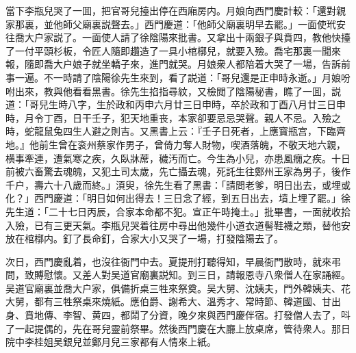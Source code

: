 當下李瓶兒哭了一囬，把官哥兒擡出停在西廂房内。月娘向西門慶計較：「還對親家那裏，並他師父廟裏説聲去。」西門慶道：「他師父廟裏明早去罷。」一面使玳安往喬大户家説了。一面使人請了徐陰陽來批書。又拿出十兩銀子與賁四，教他快擡了一付平頭杉板，令匠人隨即趲造了一具小棺槨兒，就要入殮。喬宅那裏一聞來報，隨即喬大户娘子就坐轎子來，進門就哭。月娘衆人都陪着大哭了一場，告訴前事一遍。不一時請了陰陽徐先生來到，看了説道：「哥兒還是正申時永逝。」月娘吩咐出來，教與他看看黑書。徐先生掐指尋紋，又檢閲了陰陽秘書，瞧了一囬，説道：「哥兒生時八字，生於政和丙申六月廿三日申時，卒於政和丁酉八月廿三日申時，月令丁酉，日干壬子，犯天地重丧，本家卻要忌忌哭聲。親人不忌。入殮之時，蛇龍鼠兔四生人避之則吉。又黑書上云：『壬子日死者，上應寳瓶宫，下臨齊地。』他前生曾在衮州蔡家作男子，曾倚力奪人財物，喫酒落魄，不敬天地六親，横事牽連，遭氣寒之疾，久臥牀蓆，穢汚而亡。今生為小兒，亦患風癇之疾。十日前被六畜驚去魂魄，又犯土司太歲，先亡攝去魂，死託生往鄭州王家為男子，後作千户，壽六十八歲而終。」湏臾，徐先生看了黑書：「請問老爹，明日出去，或埋或化？」西門慶道：「明日如何出得去！三日念了經，到五日出去，墳上埋了罷。」徐先生道：「二十七日丙辰，合家本命都不犯。宣正午時掩土。」批畢書，一面就收拾入殮，已有三更天氣。李瓶兒哭着往房中尋出他幾件小道衣道髻鞋襪之類，替他安放在棺槨内。釘了長命釘，合家大小又哭了一場，打發陰陽去了。

次日，西門慶亂着，也沒往衙門中去。夏提刑打聽得知，早晨衙門散時，就來弔問，致賻慰懷。又差人對吴道官廟裏説知。到三日，請報恩寺八衆僧人在家誦經。吴道官廟裏並喬大户家，俱備折桌三牲來祭奠。吴大舅、沈姨夫，門外韓姨夫、花大舅，都有三牲祭桌來燒紙。應伯爵、謝希大、溫秀才、常時節、韓道國、甘出身、賁地傳、李智、黄四，都鬦了分資，晚夕來與西門慶伴宿。打發僧人去了，呌了一起提偶的，先在哥兒靈前祭畢。然後西門慶在大廳上放桌席，管待衆人。那日院中李桂姐吴銀兒並鄭月兒三家都有人情來上紙。

